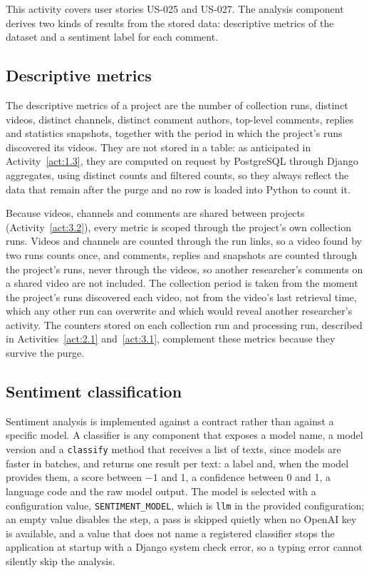 This activity covers user stories US-025 and US-027. The analysis component derives two kinds of results from the stored data: descriptive metrics of the dataset and a sentiment label for each comment.

\subsection{Descriptive metrics}

The descriptive metrics of a project are the number of collection runs, distinct videos, distinct channels, distinct comment authors, top-level comments, replies and statistics snapshots, together with the period in which the project's runs discovered its videos. They are not stored in a table: as anticipated in Activity~\ref{act:1.3}, they are computed on request by PostgreSQL through Django aggregates, using distinct counts and filtered counts, so they always reflect the data that remain after the purge and no row is loaded into Python to count it.

Because videos, channels and comments are shared between projects (Activity~\ref{act:3.2}), every metric is scoped through the project's own collection runs. Videos and channels are counted through the run links, so a video found by two runs counts once, and comments, replies and snapshots are counted through the project's runs, never through the videos, so another researcher's comments on a shared video are not included. The collection period is taken from the moment the project's runs discovered each video, not from the video's last retrieval time, which any other run can overwrite and which would reveal another researcher's activity. The counters stored on each collection run and processing run, described in Activities~\ref{act:2.1} and~\ref{act:3.1}, complement these metrics because they survive the purge.

\subsection{Sentiment classification}

Sentiment analysis is implemented against a contract rather than against a specific model. A classifier is any component that exposes a model name, a model version and a \texttt{classify} method that receives a list of texts, since models are faster in batches, and returns one result per text: a label and, when the model provides them, a score between $-1$ and 1, a confidence between 0 and 1, a language code and the raw model output. The model is selected with a configuration value, \texttt{SENTIMENT\_\allowbreak MODEL}, which is \texttt{llm} in the provided configuration; an empty value disables the step, a pass is skipped quietly when no OpenAI key is available, and a value that does not name a registered classifier stops the application at startup with a Django system check error, so a typing error cannot silently skip the analysis.

